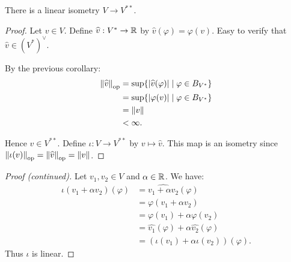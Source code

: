 \documentclass[10pt]{beamer}
\theoremstyle{plain} %
\theoremstyle{remark} %
\begin{document}
\begin{frame}
    \begin{theorem}
        There is a linear isometry $V \rightarrow V^{\ast \ast}$.
    \end{theorem}
    \pause
    \begin{proof}
        Let $v \in V$. Define $\widehat{v}:V^\ast \rightarrow \mathbb{R}$ by $\widehat{v}(\varphi) = \varphi(v)$. Easy to verify that $\widehat{v} \in (V^{\ast})^{\lor}$. \nl
        
        \noindent By the previous corollary:
            \begin{equation*}
            \begin{split}
                \left\lVert \widehat{v} \right\rVert_{\operatorname{op}} 
                & = \sup\{|\widehat{v}(\varphi)| \mid \varphi \in B_{V^\ast}\} \\
                & = \sup\{|\varphi(v)| \mid \varphi \in B_{V^\ast}\} \\
                & = \left\lVert v \right\rVert \\
                & < \infty.
            \end{split}
            \end{equation*}
        
        Hence $\widehat{v} \in V^{\ast\ast}$. Define $\iota:V \rightarrow V^{\ast\ast}$ by $v \mapsto \widehat{v}$. This map is an isometry since $\left\lVert \iota(v) \right\rVert_{\operatorname{op}} = \left\lVert \widehat{v} \right\rVert_{\operatorname{op}} = \left\lVert v \right\rVert$.\phantom{\qedhere}
    \end{proof}
\end{frame}

\begin{frame}
    \begin{proof}[Proof (continued)]
        Let $v_1,v_2 \in V$ and $\alpha \in \mathbb{R}$. We have:
            \begin{equation*}
            \begin{split}
                \iota(v_1 + \alpha v_2)(\varphi) 
                & = \widehat{v_1 + \alpha v_2}(\varphi) \\
                & = \varphi(v_1 + \alpha v_2) \\
                & = \varphi(v_1) + \alpha \varphi(v_2) \\
                & = \widehat{v_1}(\varphi) + \alpha \widehat{v_2}(\varphi) \\
                & = (\iota(v_1) + \alpha \iota(v_2))(\varphi).
            \end{split}
            \end{equation*}
        Thus $\iota$ is linear.
    \end{proof}
\end{frame}
\end{document}
